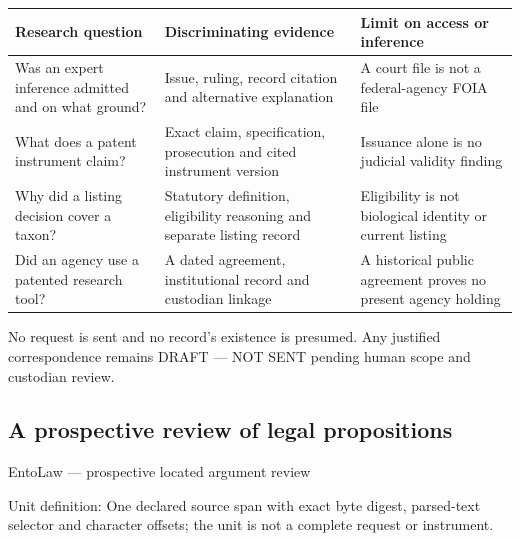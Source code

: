 \documentclass[
  english,
]{article}
\newcounter{none} %
\begin{document}
{\def\LTcaptype{none} %
\begin{longtable}[]{@{}
  >{\raggedright\arraybackslash}p{}
  >{\raggedright\arraybackslash}p{}
  >{\raggedright\arraybackslash}p{}@{}}
\toprule\noalign{}
\begin{minipage}[b]{\linewidth}\raggedright
Research question
\end{minipage} & \begin{minipage}[b]{\linewidth}\raggedright
Discriminating evidence
\end{minipage} & \begin{minipage}[b]{\linewidth}\raggedright
Limit on access or inference
\end{minipage} \\
\midrule\noalign{}
\endhead
\bottomrule\noalign{}
\endlastfoot
Was an expert inference admitted and on what ground? & Issue, ruling,
record citation and alternative explanation & A court file is not a
federal-agency FOIA file \\
What does a patent instrument claim? & Exact claim, specification,
prosecution and cited instrument version & Issuance alone is no judicial
validity finding \\
Why did a listing decision cover a taxon? & Statutory definition,
eligibility reasoning and separate listing record & Eligibility is not
biological identity or current listing \\
Did an agency use a patented research tool? & A dated agreement,
institutional record and custodian linkage & A historical public
agreement proves no present agency holding \\
\end{longtable}
}

No request is sent and no record's existence is presumed. Any justified
correspondence remains DRAFT --- NOT SENT pending human scope and
custodian review.

\subsection{A prospective review of legal
propositions}\label{a-prospective-review-of-legal-propositions}

EntoLaw --- prospective located argument review

Unit definition: One declared source span with exact byte digest,
parsed-text selector and character offsets; the unit is not a complete
request or instrument.
\end{document}
